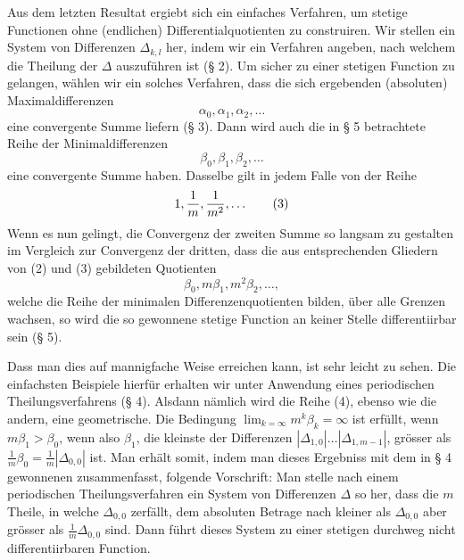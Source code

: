 \documentclass[11pt,a4paper]{article}
\begin{document}
Aus dem letzten Resultat ergiebt sich ein einfaches Verfahren, um stetige Functionen ohne (endlichen) Differentialquotienten zu construiren. Wir stellen ein System von Differenzen $\Delta_{k,l}$ her, indem wir ein Verfahren angeben, nach welchem die Theilung der $\Delta$ auszuführen ist (§ 2). Um sicher zu einer stetigen Function zu gelangen, wählen wir ein solches Verfahren, dass die sich ergebenden (absoluten) Maximaldifferenzen
\begin{equation}
 \alpha_0,\alpha_1,\alpha_2,\ldots
\tag{1}
\end{equation}
eine convergente Summe liefern (§ 3). Dann wird auch die in § 5 betrachtete Reihe der Minimaldifferenzen
\begin{equation}
 \beta_0,\beta_1,\beta_2,\ldots
\tag{2}
\end{equation}
eine convergente Summe haben. Dasselbe gilt in jedem Falle von der Reihe
\begin{equation}
 1,{1\over m},{1\over m^2},\ldots
\tag{3}
\end{equation}
Wenn es nun gelingt, die Convergenz der zweiten Summe so langsam zu gestalten im Vergleich zur Convergenz der dritten, dass die aus entsprechenden Gliedern von (2) und (3) gebildeten Quotienten
\begin{equation}
 \beta_0,m\beta_1,m^2\beta_2,\ldots,
\tag{4}
\end{equation}
welche die Reihe der minimalen Differenzenquotienten bilden, über alle Grenzen wachsen, so wird die so gewonnene stetige Function an keiner Stelle differentiirbar sein (§ 5).

Dass man dies auf mannigfache Weise erreichen kann, ist sehr leicht zu sehen. Die einfachsten Beispiele hierfür erhalten wir unter Anwendung eines periodischen Theilungsverfahrens (§ 4). Alsdann nämlich wird die Reihe (4), ebenso wie die andern, eine geometrische. Die Bedingung $\lim_{k=\infty}m^k\beta_k=\infty$ ist erfüllt, wenn $m\beta_1>\beta_0$, wenn also $\beta_1$, die kleinste der Differenzen $|\Delta_{1,0}|\ldots|\Delta_{1,m-1}|$, grösser als $\frac1m\beta_0=\frac1m|\Delta_{0,0}|$ ist. Man erhält somit, indem man dieses Ergebniss mit dem in § 4 gewonnenen zusammenfasst, folgende Vorschrift: Man stelle nach einem periodischen Theilungsverfahren ein System von Differenzen $\Delta$ so her, dass die $m$ Theile, in welche $\Delta_{0,0}$ zerfällt, dem absoluten Betrage nach kleiner als $\Delta_{0,0}$ aber grösser als $\frac1m\Delta_{0,0}$ sind. Dann führt dieses System zu einer stetigen durchweg nicht differentiirbaren Function.
\end{document}

